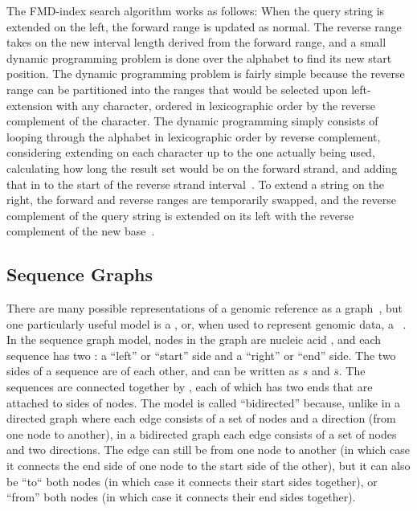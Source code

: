 The FMD-index search algorithm works as follows: When the query string is extended on the left, the forward range is updated as normal. The reverse range takes on the new interval length derived from the forward range, and a small dynamic programming problem is done over the alphabet to find its new start position. The dynamic programming problem is fairly simple because the reverse range can be partitioned into the ranges that would be selected upon left-extension with any character, ordered in lexicographic order by the reverse complement of the character. The dynamic programming simply consists of looping through the alphabet in lexicographic order by reverse complement, considering extending on each character up to the one actually being used, calculating how long the result set would be on the forward strand, and adding that in to the start of the reverse strand interval~\cite{li2012exploring}. To extend a string on the right, the forward and reverse ranges are temporarily swapped, and the reverse complement of the query string is extended on its left with the reverse complement of the new base~\cite{li2012exploring}.


\subsection{Sequence Graphs}

There are many possible representations of a genomic reference as a graph~\cite{computational2016computational}, but one particularly useful model is a , or, when used to represent genomic data, a ~\cite{paten2017genome}. In the sequence graph model, nodes in the graph are nucleic acid , and each sequence has two : a ``left'' or ``start'' side and a ``right'' or ``end'' side. The two sides of a sequence are  of each other, and can be written as $s$ and $\overline{s}$. The sequences are connected together by , each of which has two ends that are attached to sides of nodes. The model is called ``bidirected'' because, unlike in a directed graph where each edge consists of a set of nodes and a direction (from one node to another), in a bidirected graph each edge consists of a set of nodes and two directions. The edge can still be from one node to another (in which case it connects the end side of one node to the start side of the other), but it can also be ``to`` both nodes (in which case it connects their start sides together), or ``from'' both nodes (in which case it connects their end sides together).

